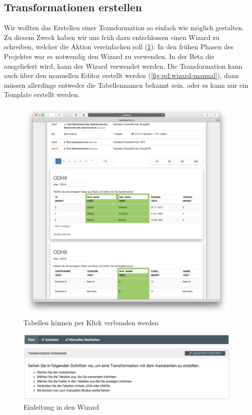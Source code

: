 \subsection{Transformationen erstellen}
Wir wollten das Erstellen einer Transformation so einfach wie möglich gestalten. Zu diesem Zweck haben wir uns früh dazu entschlossen einen Wizard zu schreiben, welcher die Aktion vereinfachen soll (\cref{fig:pd:tables_per_click}). In den frühen Phasen des Projektes war es notwendig den Wizard zu verwenden. In der Beta die ausgeliefert wird, kann der Wizard verwendet werden. Die Transformation kann auch über den manuellen Editor erstellt werden (\cref{fig:pd:wizard-manual}), dann müssen allerdings entweder die Tabellennamen bekannt sein, oder es kann nur ein Template erstellt werden.
\begin{figure}[H]
\centering
\includegraphics[width=\linewidth]{fig/odhql_wizard_early.png}
\caption{Tabellen können per Klick verbunden werden }
\label{fig:pd:tables_per_click}
\end{figure}
\begin{figure}[H]
\centering
\includegraphics[width=\linewidth]{fig/wizard-step-one.png}
\caption{Einleitung in den Wizard}
\label{fig:pd:wizard-step-one}
\end{figure}
